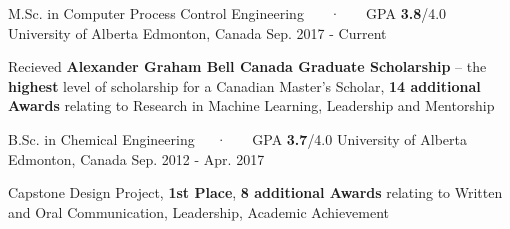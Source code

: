 

\begin{cventries}

  \cventry
    {M.Sc. in Computer Process Control Engineering ~~~·~~~ GPA \textbf{3.8}/4.0} %
    {University of Alberta} %
    {Edmonton, Canada} %
    {Sep. 2017 - Current} %
    {
      \begin{cvitems} %
        \item {Recieved \textbf{Alexander Graham Bell Canada Graduate Scholarship} – the \textbf{highest} level of scholarship for a Canadian Master's Scholar, \textbf{14 additional Awards} relating to Research in Machine Learning, Leadership and Mentorship }
      \end{cvitems}
    }

\cventry
{B.Sc. in Chemical Engineering~~~·~~~ GPA \textbf{3.7}/4.0} %
{University of Alberta} %
{Edmonton, Canada} %
{Sep. 2012 - Apr. 2017} %
{
	\begin{cvitems} %
		\item {Capstone Design Project, \textbf{1st Place}, \textbf{8 additional Awards} relating to Written and Oral Communication, Leadership, Academic Achievement}
	\end{cvitems}
}

\end{cventries}
